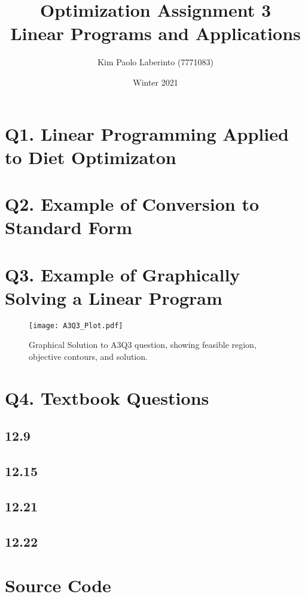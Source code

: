 \documentclass{article}
\title{Optimization Assignment 3\\Linear Programs and Applications}
\date{Winter 2021}
\author{Kim Paolo Laberinto (7771083)}
\begin{document}
    \maketitle
    \newpage

    \tableofcontents
    \newpage


    \section{Q1. Linear Programming Applied to Diet Optimizaton}

    \section{Q2. Example of Conversion to Standard Form}

    \section{Q3. Example of Graphically Solving a Linear Program}

    \begin{figure}[H]
        \centering
        \texttt{[image: A3Q3\_Plot.pdf]}
        \caption{Graphical Solution to A3Q3 question, showing feasible region, objective contours, and solution.}
        \label{fig:A3Q3_GraphicalSolution}
    \end{figure}

    \section{Q4. Textbook Questions}

    \subsection{12.9}

    \subsection{12.15}

    \subsection{12.21}

    \subsection{12.22}


    \newpage
    \appendix

    \section{Source Code}
\end{document}
